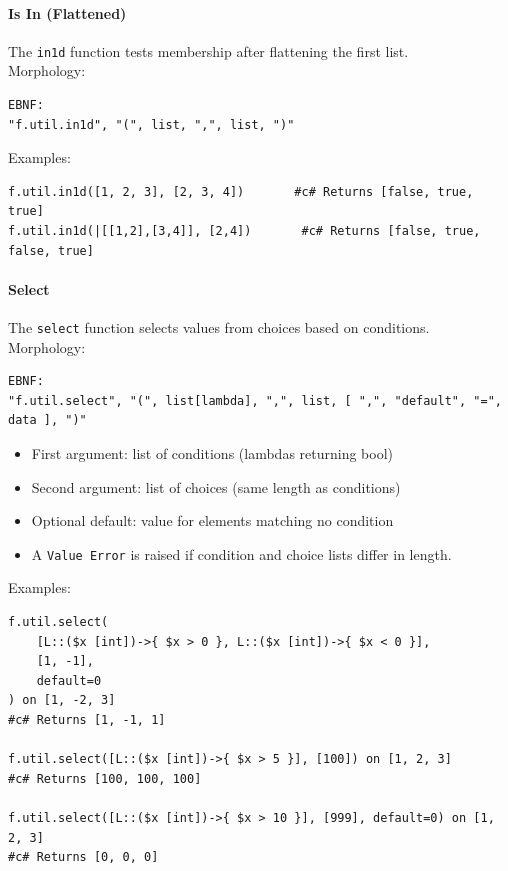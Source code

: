 \paragraph{Is In (Flattened)}
The \texttt{in1d} function tests membership after flattening the first list.\\
Morphology:
\begin{verbatim}
EBNF:
"f.util.in1d", "(", list, ",", list, ")"
\end{verbatim}
Examples:
\begin{verbatim}
f.util.in1d([1, 2, 3], [2, 3, 4])       #c# Returns [false, true, true]
f.util.in1d(|[[1,2],[3,4]], [2,4])       #c# Returns [false, true, false, true]
\end{verbatim}

\paragraph{Select}
The \texttt{select} function selects values from choices based on conditions.\\
Morphology:
\begin{verbatim}
EBNF:
"f.util.select", "(", list[lambda], ",", list, [ ",", "default", "=", data ], ")"
\end{verbatim}
\begin{itemize}
\item First argument: list of conditions (lambdas returning bool)
\item Second argument: list of choices (same length as conditions)
\item Optional default: value for elements matching no condition
\item A \texttt{Value Error} is raised if condition and choice lists differ in length.
\end{itemize}
Examples:
\begin{verbatim}
f.util.select(
    [L::($x [int])->{ $x > 0 }, L::($x [int])->{ $x < 0 }],
    [1, -1],
    default=0
) on [1, -2, 3]
#c# Returns [1, -1, 1]

f.util.select([L::($x [int])->{ $x > 5 }], [100]) on [1, 2, 3]
#c# Returns [100, 100, 100]

f.util.select([L::($x [int])->{ $x > 10 }], [999], default=0) on [1, 2, 3]
#c# Returns [0, 0, 0]
\end{verbatim}

